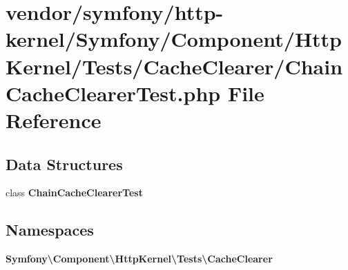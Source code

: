 \section{vendor/symfony/http-\/kernel/\+Symfony/\+Component/\+Http\+Kernel/\+Tests/\+Cache\+Clearer/\+Chain\+Cache\+Clearer\+Test.php File Reference}
\label{_chain_cache_clearer_test_8php}
\subsection*{Data Structures}
\begin{DoxyCompactItemize}
\item 
class {\bf Chain\+Cache\+Clearer\+Test}
\end{DoxyCompactItemize}
\subsection*{Namespaces}
\begin{DoxyCompactItemize}
\item 
 {\bf Symfony\textbackslash{}\+Component\textbackslash{}\+Http\+Kernel\textbackslash{}\+Tests\textbackslash{}\+Cache\+Clearer}
\end{DoxyCompactItemize}
